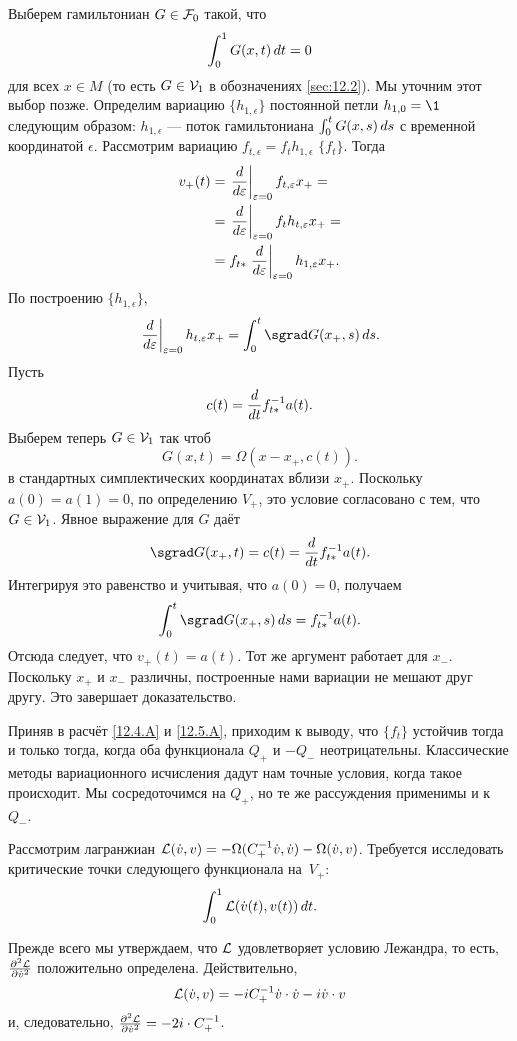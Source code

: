 Выберем гамильтониан $G\in\mathcal{F}_0$ такой, что
\[\int_0^1G(x, t)\,d t = 0\]
для всех $x\in M$ (то есть $G\in\mathcal{V}_1$ в обозначениях \ref{sec:12.2}).
Мы уточним этот выбор позже.
Определим вариацию $\{h_{1,\epsilon}\}$ постоянной петли $h_{1,0} = \1$ следующим образом: $h_{1,\epsilon}$ — поток гамильтониана $\int_0^tG(x,s)\,d s$ с временной координатой $\epsilon$.
Рассмотрим вариацию $f_{t,\epsilon} = f_th_{1,\epsilon}$  $\{f_t\}$.
Тогда
\begin{align*}
v_+(t) &= \left.\frac{d}{d \varepsilon}\right|_{\varepsilon=0} f_{t,\varepsilon} x_+ =
\\
&=\left.\frac{d}{d \varepsilon}\right|_{\varepsilon=0}f_th_{t,\varepsilon} x_+=
\\
&=
f_{t*} \left.\frac{d}{d \varepsilon}\right|_{\varepsilon=0} h_{1,\varepsilon} x_+.
\end{align*}
По построению $\{h_{1,\epsilon}\}$,
\[\left.\frac{\d}{\d \epsilon}\right|_{\epsilon=0}h_{t,\epsilon}x_+
=
\int_0^t\sgrad G(x_+,s)\,\d s.\]
Пусть 
\[c(t) = \frac{d}{d t}f^{-1}_{t*} a(t).\]
Выберем теперь $G \in \mathcal{V}_1$ так чтоб 
\[G(x, t) = \Omega(x - x_+, c(t)).\]
в стандартных симплектических координатах вблизи $x_+$.
Поскольку $a(0) = a(1) = 0$, по определению $V_+$, это условие согласовано с тем, что $G\in\mathcal{V}_1$.
Явное выражение для $G$ даёт 
\[\sgrad G(x_+, t) = c(t) = \frac{\d}{\d t}f^{-1}_{t*} a(t).\]
Интегрируя это равенство и учитывая, что $a(0) = 0$, получаем
\[\int_0^t\sgrad G(x_+, s)\,\d s = f_{t*}^{-1}a(t).\]
Отсюда следует, что $v_+(t) = a(t)$.
Тот же аргумент работает для $x_-$.
Поскольку $x_+$ и $x_-$ различны, построенные нами вариации не мешают друг другу.
Это завершает доказательство.
\qeds

Приняв в расчёт \ref{12.4.A} и \ref{12.5.A}, приходим к выводу, что  $\{f_t\}$ устойчив тогда и только тогда, когда оба функционала $Q_+$ и $-Q_-$ неотрицательны.
Классические методы вариационного исчисления дадут нам точные условия, когда такое происходит.
Мы сосредоточимся на $Q_+$, но те же рассуждения применимы и к $Q_-$.

Рассмотрим лагранжиан $\mathcal{L}(\dot v, v) = -\Omega(C_+^{-1}\dot v, \dot v) - \Omega(\dot v, v)$.
Требуется исследовать критические точки следующего функционала на~$V_+$:
\[\int_0^1 \mathcal{L}(\dot v(t), v(t))\,d t.\]

Прежде всего мы утверждаем, что $\mathcal{L}$ удовлетворяет условию Лежандра, то есть, $\tfrac{\partial^2\mathcal{L}}{\partial\dot v^2}$ положительно определена.
Действительно, 
\[\mathcal{L}( \dot v, v) = -iC_+^{-1} \dot v\cdot\dot v - i\dot v\cdot v\]
и, следовательно, $\tfrac{\partial^2\mathcal{L}}{\partial\dot v^2}= - 2i\cdot C_+^{-1}$.

